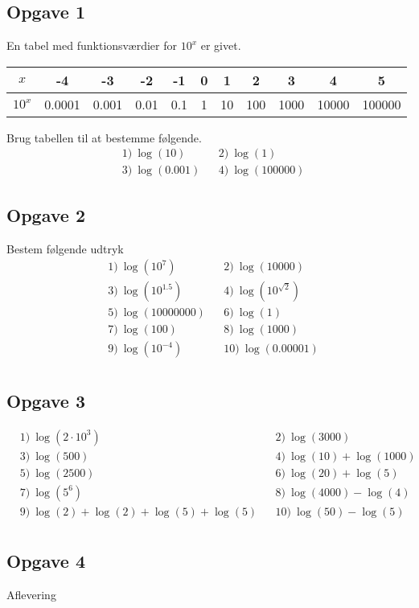 \subsection*{Opgave 1}
En tabel med funktionsværdier for $10^x$ er givet.
\begin{table}[H]
	\centering
	\begin{tabular}{c|c|c|c|c|c|c|c|c|c|c}
		$x$ & -4 & -3 & -2 & -1 & 0 & 1 & 2 & 3 & 4 & 5 \\
		\hline
		$10^x$ & 0.0001 & 0.001 & 0.01& 0.1 & 1 & 10 & 100 & 1000 & 10000 & 100000
	\end{tabular}
\end{table}
Brug tabellen til at bestemme følgende.
\begin{align*}
	&1) \ \log(10)     &&2) \ \log(1)    \\
	&3) \ \log(0.001)     &&4) \  \log(100000)   
\end{align*}


\subsection*{Opgave 2}
Bestem følgende udtryk 
\begin{align*}
	&1) \ \log(10^7)    &&2) \ \log(10000)   \\  
	&3) \ \log(10^{1.5})   &&4) \ \log(10^{\sqrt{2}})     \\  
	&5) \ \log(10000000)   &&6) \ \log(1)   \\  
	&7) \ \log(100)			&&8) \ \log(1000)  \\
	&9) \ \log(10^{-4})     &&10) \ \log(0.00001) \\ 
\end{align*}

\subsection*{Opgave 3}
\begin{align*}
	&1) \ \log(2\cdot 10^3) && 2) \ \log(3000) \\
	&3) \ \log(500)        && 4) \ \log(10) + \log(1000) \\
	&5) \  \log(2500)  &&6) \ \log(20)+ \log(5)   \\   
	&7) \  \log(5^6)  &&8) \ \log(4000) - \log(4)   \\   
	&9) \  \log(2)+\log(2)+\log(5) + \log(5)  &&10) \ \log(50)-\log(5)  \\ 
\end{align*}	


\subsection*{Opgave 4}

Aflevering